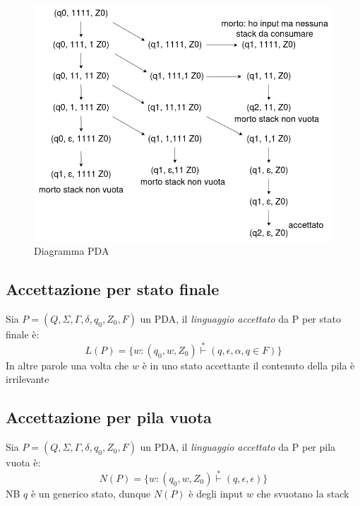 \documentclass[12pt]{article}
\begin{document}
	\begin{figure}[ht]
		\includegraphics[scale = 0.5]{media/diagramma_pda.png}
		\centering
    \caption{Diagramma PDA}
	\end{figure}

\subsection{Accettazione per stato finale} 
Sia $P=(Q,\Sigma, \Gamma, \delta, q_0, Z_0, F)$ un PDA, il \emph{linguaggio accettato} da P per stato finale è: 
\[L(P)=\{w:(q_0,w,Z_0) \overset{*}{\vdash}(q,\epsilon,\alpha, q \in F)\}\]
In altre parole una volta che $w$ è in uno stato accettante il contenuto della pila è irrilevante

\subsection{Accettazione per pila vuota} 
Sia $P=(Q,\Sigma, \Gamma, \delta, q_0, Z_0, F)$ un PDA, il \emph{linguaggio accettato} da P per pila vuota è: 
\[N(P)=\{w:(q_0,w,Z_0) \overset{*}{\vdash}(q,\epsilon,\epsilon)\}\]
NB $q$ è un generico stato, dunque $N(P)$ è degli input $w$ che svuotano la stack

\newpage
\end{document}
